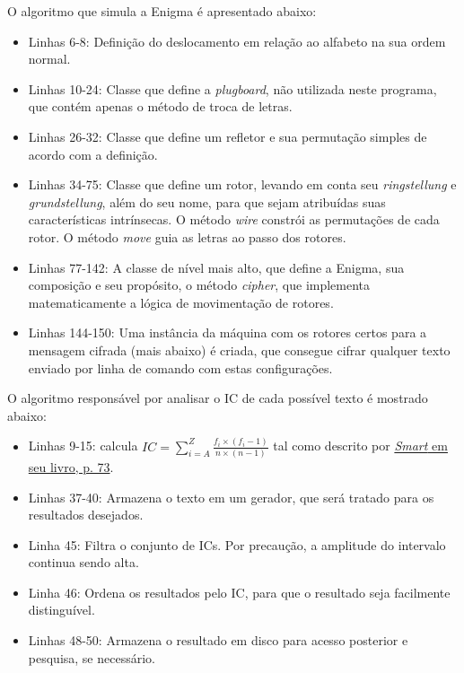 \documentclass{article}
\begin{document}
O algoritmo que simula a Enigma é apresentado abaixo:

\begin{itemize}
    \item Linhas 6-8: Definição do deslocamento em relação ao alfabeto na sua ordem normal.
    \item Linhas 10-24: Classe que define a \textit{plugboard}, não utilizada neste programa, que contém apenas o método de troca de letras.
    \item Linhas 26-32: Classe que define um refletor e sua permutação simples de acordo com a definição.
    \item Linhas 34-75: Classe que define um rotor, levando em conta seu \textit{ringstellung} e \textit{grundstellung}, além do seu nome, para que sejam atribuídas suas características intrínsecas. O método \textit{wire} constrói as permutações de cada rotor. O método \textit{move} guia as letras ao passo dos rotores.
    \item Linhas 77-142: A classe de nível mais alto, que define a Enigma, sua composição e seu propósito, o método \textit{cipher}, que implementa matematicamente a lógica de movimentação de rotores.
    \item Linhas 144-150: Uma instância da máquina com os rotores certos para a mensagem cifrada (mais abaixo) é criada, que consegue cifrar qualquer texto enviado por linha de comando com estas configurações.
\end{itemize}
O algoritmo responsável por analisar o IC de cada possível texto é mostrado abaixo:

\begin{itemize}
    \item Linhas 9-15: calcula $IC = \sum_{i=A}^Z \frac{f_i \times (f_i - 1)}{n \times (n - 1)}$ tal como descrito por \href{http://www.cs.umd.edu/~waa/414-F11/IntroToCrypto.pdf}{\textit{Smart} em seu livro, p. 73}.
    \item Linhas 37-40: Armazena o texto em um gerador, que será tratado para os resultados desejados.
    \item Linha 45: Filtra o conjunto de ICs. Por precaução, a amplitude do intervalo continua sendo alta.
    \item Linha 46: Ordena os resultados pelo IC, para que o resultado seja facilmente distinguível.
    \item Linhas 48-50: Armazena o resultado em disco para acesso posterior e pesquisa, se necessário.
\end{itemize}
\end{document}
